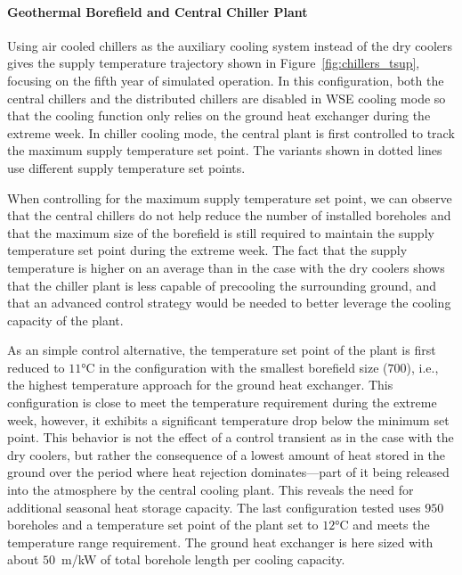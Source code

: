 \paragraph{Geothermal Borefield and Central Chiller Plant}

Using air cooled chillers as the auxiliary cooling system instead of the dry coolers gives the supply temperature trajectory shown in Figure~\ref{fig:chillers_tsup}, focusing on the fifth year of simulated operation.
In this configuration, both the central chillers and the distributed chillers are disabled in WSE cooling mode so that the cooling function only relies on the ground heat exchanger during the extreme week.
In chiller cooling mode, the central plant is first controlled to track the maximum supply temperature set point. The variants shown in dotted lines use different supply temperature set points.

When controlling for the maximum supply temperature set point, we can observe that the central chillers do not help reduce the number of installed boreholes and  that the maximum size of the borefield is still required to maintain the supply temperature set point during the extreme week. The fact that the supply temperature is higher on an average than in the case with the dry coolers shows that the chiller plant is less capable of precooling the surrounding ground, and that an advanced control strategy would be needed to better leverage the cooling capacity of the plant.

As an simple control alternative, the temperature set point of the plant is first reduced to $11$°C in the configuration with the smallest borefield size ($700$), i.e., the highest temperature approach for the ground heat exchanger. This configuration is close to meet the temperature requirement during the extreme week, however, it exhibits a significant temperature drop below the minimum set point.
This behavior is not the effect of a control transient as in the case with the dry coolers, but rather the consequence of a lowest amount of heat stored in the ground over the period where heat rejection dominates---part of it being released into the atmosphere by the central cooling plant. This reveals the need for additional seasonal heat storage capacity.
The last configuration tested uses $950$ boreholes and a temperature set point of the plant set to $12$°C and meets the temperature range requirement.
The ground heat exchanger is here sized with about $50$~m/kW of total borehole length per cooling capacity.



